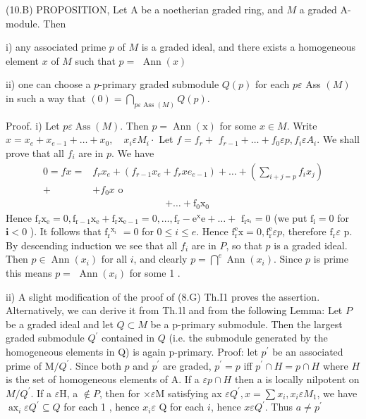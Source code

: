 (10.B) PROPOSITION, Let A be a noetherian graded ring, and $M$ a graded A-module. Then

i) any associated prime $p$ of $M$ is a graded ideal, and there exists a homogeneous element $x$ of $M$ such that $p=$ $\operatorname{Ann}(x)$

ii) one can choose a $p$-primary graded submodule $Q(p)$ for each $p \varepsilon$ Ass $(M)$ in such a way that $(0)=\bigcap_{p \varepsilon \text { Ass }(M)} Q(p)$.

Proof. i) Let $p \varepsilon \operatorname{Ass}(M)$. Then $p=\operatorname{Ann}(\mathrm{x})$ for some $x \in M$. Write $x=x_{e}+x_{e-1}+\ldots+x_{0}, \quad x_{i} \varepsilon M_{i} \cdot$ Let $f=f_{r}+$ $f_{r-1}+\ldots+f_{0} \varepsilon p, f_{i} \varepsilon A_{i}$. We shall prove that all $f_{i}$ are in $p$. We have
$$
\begin{aligned}
0=f x=& f_{r} x_{e}+\left(f_{r-1} x_{e}+f_{r} x e_{e-1}\right)+\ldots+\left(\sum_{i+j=p} f_{i} x_{j}\right) \\
+&+f_{0} x \text { o }
\end{aligned}
$$
$$
\begin{aligned}
& +\ldots+\mathrm{f}_{0} \mathrm{x}_{0}
\end{aligned}
$$
Hence $\mathrm{f}_{\mathrm{r}} \mathrm{x}_{\mathrm{e}}=0, \mathrm{f}_{\mathrm{r}-1} \mathrm{x}_{\mathrm{e}}+\mathrm{f}_{\mathrm{r}} \mathrm{x}_{\mathrm{e}-1}=0, \ldots, \mathrm{f}_{\mathrm{r}}-\mathrm{e}^{\mathrm{x}} \mathrm{e}+\ldots+$ $\mathrm{f}_{\mathrm{r}^{\mathrm{x}_{0}}}=0$ (we put $\mathrm{f}_{\mathrm{i}}=0$ for $\mathbf{i}<0$ ). It follows that $\mathrm{f}_{\mathrm{r}}{ }^{\mathrm{x}_{i}}$ $=0$ for $0 \leqslant i \leqslant e$. Hence $\mathrm{f}_{\mathrm{r}}^{\mathrm{e}} \mathrm{x}=0, \mathrm{f}_{\mathrm{r}}^{\mathrm{e}} \varepsilon p$, therefore $\mathrm{f}_{\mathrm{r}} \varepsilon$ p. By descending induction we see that all $f_{i}$ are in $P$, so that $p$ is a graded ideal. Then $p \in \operatorname{Ann}\left(x_{i}\right)$ for all $i$, and clearly $p=\bigcap^{e} \operatorname{Ann}\left(x_{i}\right)$. Since $p$ is prime this means $p=$ $\operatorname{Ann}\left(x_{i}\right)$ for some 1 .

ii) A slight modification of the proof of (8.G) Th.I1 proves the assertion. Alternatively, we can derive it from Th.1l and from the following Lemma: Let $P$ be a graded ideal and let $Q \subset M$ be a p-primary submodule. Then the largest graded submodule $Q^{\prime}$ contained in $Q$ (i.e. the submodule generated by the homogeneous elements in Q) is again p-primary. Proof: let $p^{\prime}$ be an associated prime of $\mathrm{M} / Q^{\prime}$. Since both $p$ and $p^{\prime}$ are graded, $p^{\prime}=p$ iff $p^{\prime} \cap H=p \cap H$ where $H$ is the set of homogeneous elements of A. If a $\varepsilon p \cap H$ then a is locally nilpotent on $M / Q^{\prime}$. If a $\varepsilon \mathrm{H}$, a $\notin P$, then for $\times \varepsilon \mathrm{M}$ satisfying ax $\varepsilon Q^{\prime}, x=\sum x_{i}, x_{i} \varepsilon M_{1}$, we have $\operatorname{ax}_{i} \varepsilon Q^{\prime} \subseteq Q$ for each 1 , hence $x_{i} \varepsilon$ Q for each $i$, hence $x \varepsilon Q^{\prime}$. Thus $a \neq p^{\prime}$

